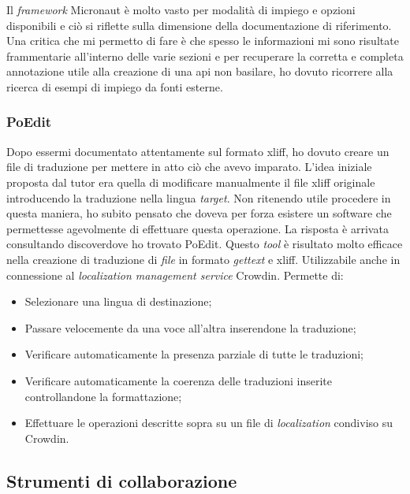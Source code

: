 Il \textit{framework} Micronaut è molto vasto per modalità di impiego e opzioni disponibili e ciò si riflette sulla dimensione della documentazione di riferimento.
Una critica che mi permetto di fare è che spesso le informazioni mi sono risultate frammentarie all'interno delle varie sezioni e per recuperare la corretta e completa annotazione utile alla creazione di una \acrshort{api} non basilare, ho dovuto ricorrere alla ricerca di esempi di impiego da fonti esterne.
\subsubsection{PoEdit}
Dopo essermi documentato attentamente sul formato \acrshort{xliff}, ho dovuto creare un file di traduzione per mettere in atto ciò che avevo imparato. L'idea iniziale proposta dal tutor era quella di modificare manualmente il file \acrshort{xliff} originale introducendo la traduzione nella lingua \textit{target}. Non ritenendo utile procedere in questa maniera, ho subito pensato che doveva per forza esistere un software che permettesse agevolmente di effettuare questa operazione. La risposta è arrivata consultando \gls{discover}\glsfirstoccur dove ho trovato PoEdit.
Questo \textit{tool} è risultato molto efficace nella creazione di traduzione di \textit{file} in formato \emph{gettext} e \acrshort{xliff}. Utilizzabile anche in connessione al \textit{localization management service} Crowdin. Permette di:
\begin{itemize}
    \item Selezionare una lingua di destinazione;
    \item Passare velocemente da una voce all'altra inserendone la traduzione;
    \item Verificare automaticamente la presenza parziale di tutte le traduzioni;
    \item Verificare automaticamente la coerenza delle traduzioni inserite controllandone la formattazione;
    \item Effettuare le operazioni descritte sopra su un file di \textit{localization} condiviso su Crowdin.
\end{itemize}
\subsection{Strumenti di collaborazione}
